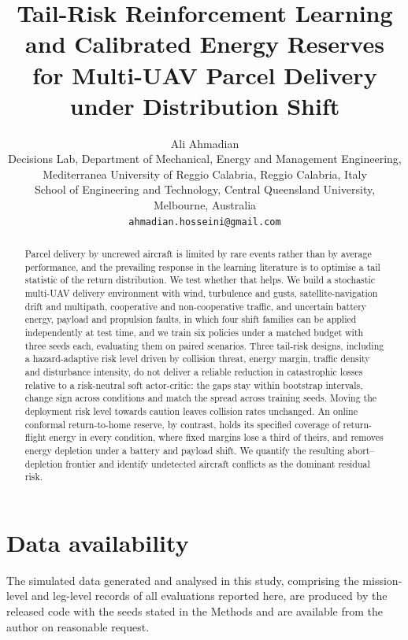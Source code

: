 \documentclass[11pt]{article}
\title{\vspace{-1.2cm}\bfseries Tail-Risk Reinforcement Learning and Calibrated Energy Reserves for Multi-UAV Parcel Delivery under Distribution Shift}
\author{Ali Ahmadian\\[2pt]
\small Decisions Lab, Department of Mechanical, Energy and Management Engineering,\\
\small Mediterranea University of Reggio Calabria, Reggio Calabria, Italy\\
\small School of Engineering and Technology, Central Queensland University, Melbourne, Australia\\
\small \texttt{ahmadian.hosseini@gmail.com}}
\date{}
\theoremstyle{definition}
\begin{document}
\maketitle

\begin{abstract}
\noindent Parcel delivery by uncrewed aircraft is limited by rare events rather than by average performance, and the prevailing response in the learning literature is to optimise a tail statistic of the return distribution. We test whether that helps. We build a stochastic multi-UAV delivery environment with wind, turbulence and gusts, satellite-navigation drift and multipath, cooperative and non-cooperative traffic, and uncertain battery energy, payload and propulsion faults, in which four shift families can be applied independently at test time, and we train six policies under a matched budget with three seeds each, evaluating them on paired scenarios. Three tail-risk designs, including a hazard-adaptive risk level driven by collision threat, energy margin, traffic density and disturbance intensity, do not deliver a reliable reduction in catastrophic losses relative to a risk-neutral soft actor-critic: the gaps stay within bootstrap intervals, change sign across conditions and match the spread across training seeds. Moving the deployment risk level towards caution leaves collision rates unchanged. An online conformal return-to-home reserve, by contrast, holds its specified coverage of return-flight energy in every condition, where fixed margins lose a third of theirs, and removes energy depletion under a battery and payload shift. We quantify the resulting abort--depletion frontier and identify undetected aircraft conflicts as the dominant residual risk.
\end{abstract}












\section*{Data availability}
The simulated data generated and analysed in this study, comprising the mission-level and leg-level records of all evaluations reported here, are produced by the released code with the seeds stated in the Methods and are available from the author on reasonable request.
\end{document}
